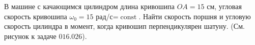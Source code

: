 В машине с качающимся цилиндром длина кривошипа $OA=15$ см, угловая скорость
кривошипа $\omega_{0}=15$ рад/с=$\mathop{const}$.
Найти скорость поршня и угловую скорость
цилиндра в момент, когда кривошип перпендикулярен шатуну.
(См. рисунок к задаче $016.026$).

